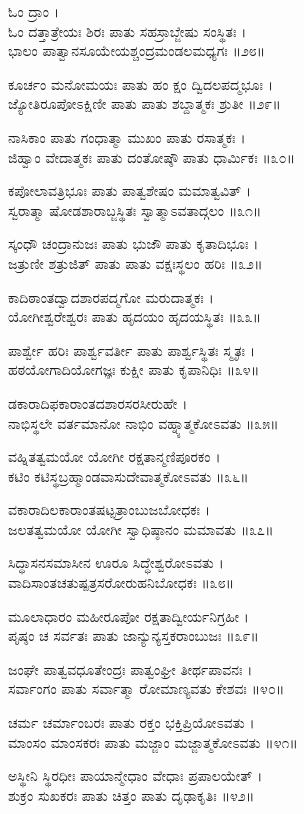 ಓಂ ದ್ರಾಂ ।\\
ಓಂ ದತ್ತಾತ್ರೇಯಃ ಶಿರಃ ಪಾತು ಸಹಸ್ರಾಬ್ಜೇಷು ಸಂಸ್ಥಿತಃ ।\\
ಭಾಲಂ ಪಾತ್ವಾನಸೂಯೇಯಶ್ಚಂದ್ರಮಂಡಲಮಧ್ಯಗಃ ॥೨೮॥

ಕೂರ್ಚಂ ಮನೋಮಯಃ ಪಾತು ಹಂ ಕ್ಷಂ ದ್ವಿದಲಪದ್ಮಭೂಃ ।\\
ಜ್ಯೋತಿರೂಪೋಽಕ್ಷಿಣೀ ಪಾತು ಪಾತು ಶಬ್ದಾತ್ಮಕಃ ಶ್ರುತೀ ॥೨೯॥

ನಾಸಿಕಾಂ ಪಾತು ಗಂಧಾತ್ಮಾ ಮುಖಂ ಪಾತು ರಸಾತ್ಮಕಃ ।\\
ಜಿಹ್ವಾಂ ವೇದಾತ್ಮಕಃ ಪಾತು ದಂತೋಷ್ಠೌ ಪಾತು ಧಾರ್ಮಿಕಃ ॥೩೦॥

ಕಪೋಲಾವತ್ರಿಭೂಃ ಪಾತು ಪಾತ್ವಶೇಷಂ ಮಮಾತ್ವವಿತ್ ।\\
ಸ್ವರಾತ್ಮಾ ಷೋಡಶಾರಾಬ್ಜಸ್ಥಿತಃ ಸ್ವಾತ್ಮಾಽವತಾದ್ಗಲಂ ॥೩೧॥

ಸ್ಕಂಧೌ ಚಂದ್ರಾನುಜಃ ಪಾತು ಭುಜೌ ಪಾತು ಕೃತಾದಿಭೂಃ ।\\
ಜತ್ರುಣೀ ಶತ್ರುಜಿತ್ ಪಾತು ಪಾತು ವಕ್ಷಃಸ್ಥಲಂ ಹರಿಃ ॥೩೨॥

ಕಾದಿಠಾಂತದ್ವಾದಶಾರಪದ್ಮಗೋ ಮರುದಾತ್ಮಕಃ ।\\
ಯೋಗೀಶ್ವರೇಶ್ವರಃ ಪಾತು ಹೃದಯಂ ಹೃದಯಸ್ಥಿತಃ ॥೩೩॥

ಪಾರ್ಶ್ವೇ ಹರಿಃ ಪಾರ್ಶ್ವವರ್ತೀ ಪಾತು ಪಾರ್ಶ್ವಸ್ಥಿತಃ ಸ್ಮೃತಃ ।\\
ಹಠಯೋಗಾದಿಯೋಗಜ್ಞಃ ಕುಕ್ಷೀ ಪಾತು ಕೃಪಾನಿಧಿಃ ॥೩೪॥

ಡಕಾರಾದಿಫಕಾರಾಂತದಶಾರಸರಸೀರುಹೇ ।\\
ನಾಭಿಸ್ಥಲೇ ವರ್ತಮಾನೋ ನಾಭಿಂ ವಹ್ನ್ಯಾತ್ಮಕೋಽವತು ॥೩೫॥

ವಹ್ನಿತತ್ವಮಯೋ ಯೋಗೀ ರಕ್ಷತಾನ್ಮಣಿಪೂರಕಂ ।\\
ಕಟಿಂ ಕಟಿಸ್ಥಬ್ರಹ್ಮಾಂಡವಾಸುದೇವಾತ್ಮಕೋಽವತು ॥೩೬॥

ವಕಾರಾದಿಲಕಾರಾಂತಷಟ್ಪತ್ರಾಂಬುಜಬೋಧಕಃ ।\\
ಜಲತತ್ವಮಯೋ ಯೋಗೀ ಸ್ವಾಧಿಷ್ಠಾನಂ ಮಮಾವತು ॥೩೭॥

ಸಿದ್ಧಾಸನಸಮಾಸೀನ ಊರೂ ಸಿದ್ಧೇಶ್ವರೋಽವತು ।\\
ವಾದಿಸಾಂತಚತುಷ್ಪತ್ರಸರೋರುಹನಿಬೋಧಕಃ ॥೩೮॥

ಮೂಲಾಧಾರಂ ಮಹೀರೂಪೋ ರಕ್ಷತಾದ್ವೀರ್ಯನಿಗ್ರಹೀ ।\\
ಪೃಷ್ಠಂ ಚ ಸರ್ವತಃ ಪಾತು ಜಾನ್ಯುನ್ಯಸ್ತಕರಾಂಬುಜಃ ॥೩೯॥

ಜಂಘೇ ಪಾತ್ವವಧೂತೇಂದ್ರಃ ಪಾತ್ವಂಘ್ರೀ ತೀರ್ಥಪಾವನಃ ।\\
ಸರ್ವಾಂಗಂ ಪಾತು ಸರ್ವಾತ್ಮಾ ರೋಮಾಣ್ಯವತು ಕೇಶವಃ ॥೪೦॥

ಚರ್ಮ ಚರ್ಮಾಂಬರಃ ಪಾತು ರಕ್ತಂ ಭಕ್ತಿಪ್ರಿಯೋಽವತು ।\\
ಮಾಂಸಂ ಮಾಂಸಕರಃ ಪಾತು ಮಜ್ಜಾಂ ಮಜ್ಜಾತ್ಮಕೋಽವತು ॥೪೧॥

ಅಸ್ಥೀನಿ ಸ್ಥಿರಧೀಃ ಪಾಯಾನ್ಮೇಧಾಂ ವೇಧಾಃ ಪ್ರಪಾಲಯೇತ್ ।\\
ಶುಕ್ರಂ ಸುಖಕರಃ ಪಾತು ಚಿತ್ತಂ ಪಾತು ದೃಢಾಕೃತಿಃ ॥೪೨॥


